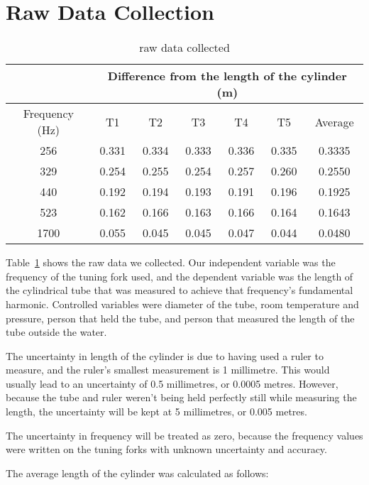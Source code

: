 \documentclass{report}
\begin{document}
\section{Raw Data Collection}

\begin{table}[H]
  \centering
  \begin{tabular}{@{}ccccccc@{}}
    \toprule
    & \multicolumn{6}{c}{Difference from the length of the cylinder
    (m)} \\
    \midrule
    Frequency (Hz) & T1    & T2    & T3    & T4    & T5    & Average \\
    256            & 0.331 & 0.334 & 0.333 & 0.336 & 0.335 & 0.3335  \\
    329            & 0.254 & 0.255 & 0.254 & 0.257 & 0.260 & 0.2550  \\
    440            & 0.192 & 0.194 & 0.193 & 0.191 & 0.196 & 0.1925  \\
    523            & 0.162 & 0.166 & 0.163 & 0.166 & 0.164 & 0.1643  \\
    1700           & 0.055 & 0.045 & 0.045 & 0.047 & 0.044 & 0.0480  \\
    \bottomrule
  \end{tabular}
  \caption{raw data collected}\label{tab:raw-data}
\end{table}

Table~\ref{tab:raw-data} shows the raw data we collected. Our
independent variable was
the frequency of the tuning fork used, and the dependent variable was
the length of the cylindrical tube that was measured to achieve that
frequency's fundamental harmonic. Controlled variables were diameter
of the tube, room temperature and pressure, person that held the
tube, and person that measured the length of the tube outside the water.

The uncertainty in length of the cylinder is due to having used a
ruler to measure, and the ruler's smallest measurement is 1
millimetre. This would usually lead to an uncertainty of 0.5
millimetres, or 0.0005 metres. However, because the tube and ruler
weren't being held perfectly still while measuring the length, the
uncertainty will be kept at 5 millimetres, or 0.005 metres.

The uncertainty in frequency will be treated as zero, because the
frequency values were written on the tuning forks with unknown
uncertainty and accuracy.

The average length of the cylinder was calculated as follows:
\end{document}
